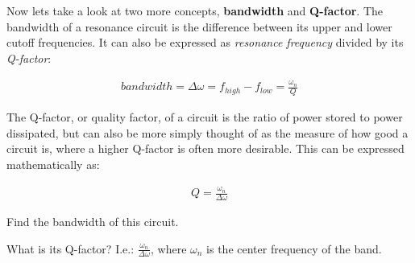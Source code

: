 \begin{enumerate}

Now lets take a look at two more concepts, \textbf{bandwidth} and \textbf{Q-factor}. The bandwidth of a resonance
circuit is the difference between its upper and lower cutoff frequencies. It can also be expressed as \textit{resonance frequency} divided by its \textit{Q-factor}:

\begin{align}
    bandwidth = \Delta \omega = f_{high} - f_{low} = \frac{\omega_n}{Q}
\end{align}

The Q-factor, or quality factor, of a circuit is the ratio of power stored to power dissipated, but can also be more simply thought of as the measure of how good a circuit is,
where a higher Q-factor is often more desirable. This can be expressed mathematically as:

\begin{align}
    Q = \frac{\omega_{n}}{\Delta \omega}
\end{align}


  \begin{enumerate}[resume]
    \qitem Find the bandwidth of this circuit.

    \qitem What is its Q-factor? I.e.: $\frac{\omega_{n}}{\Delta \omega}$, where $\omega_{n}$ is the center frequency of the band.

  \end{enumerate}
\end{enumerate}
